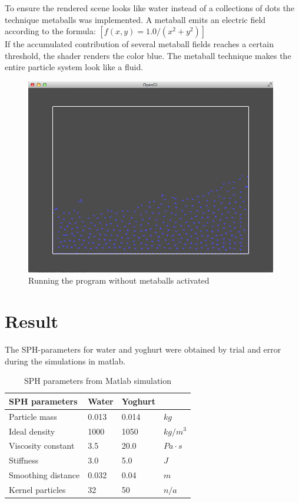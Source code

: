 \documentclass[a4paper,12pt,twoside,final]{report}
\begin{document}
\noindent To ensure the rendered scene looks like water instead of a collections of dots the technique metaballs was implemented. A metaball emits an electric field according to the formula: $[f(x,y) = 1.0 / (x^2 + y^2)]$ \\

\noindent  If the accumulated contribution of several metaball fields reaches a certain threshold, the shader renders the color blue. The metaball technique makes the entire particle system look like a fluid.

\begin{figure}[H]
\begin{center}
    \includegraphics[width=11cm]{figs/image_2.png} 
\end{center}
\caption{Running the program without metaballs activated}
\label{model_block}
\end{figure}



\chapter{Result}

The SPH-parameters for water and yoghurt were obtained by trial and error during the simulations in matlab.

\begin{table}[h]
  \centering
  \caption{SPH parameters from Matlab simulation}
  \label{Matlab table}
    \begin{tabularx}{\textwidth}{| X | X | X | l |}
    \hline
    SPH parameters & Water & Yoghurt & \\ \hline
    Particle mass & 0.013 & 0.014 & $kg$ \\ \hline
    Ideal density & 1000 & 1050 & $kg/m^3$ \\ \hline
    Viscosity constant & 3.5 & 20.0 & $Pa \cdot s$ \\ \hline
    Stiffness & 3.0 & 5.0 & $J$ \\ \hline
    Smoothing distance & 0.032 & 0.04 & $m$ \\ \hline
    Kernel particles  & 32 & 50 & $n/a$ \\ \hline
    \end{tabularx}
\end{table}
\end{document}
